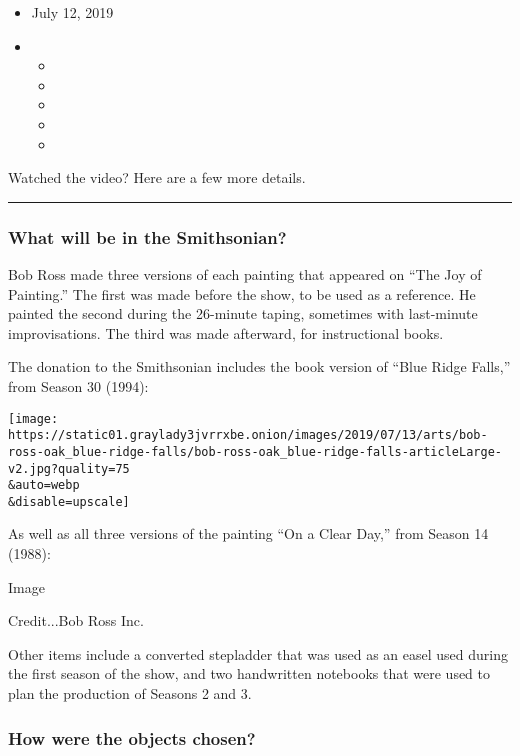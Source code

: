 \begin{itemize}
\item
  July 12, 2019
\item
  \begin{itemize}
  \item
  \item
  \item
  \item
  \item
  \end{itemize}
\end{itemize}

Watched the video? Here are a few more details.

\begin{center}\rule{0.5\linewidth}{\linethickness}\end{center}

\hypertarget{what-will-be-in-the-smithsonian}{%
\subsubsection{What will be in the
Smithsonian?}\label{what-will-be-in-the-smithsonian}}

Bob Ross made three versions of each painting that appeared on ``The Joy
of Painting.'' The first was made before the show, to be used as a
reference. He painted the second during the 26-minute taping, sometimes
with last-minute improvisations. The third was made afterward, for
instructional books.

The donation to the Smithsonian includes the book version of ``Blue
Ridge Falls,'' from Season 30 (1994):

\texttt{[image: https://static01.graylady3jvrrxbe.onion/images/2019/07/13/arts/bob-ross-oak\_blue-ridge-falls/bob-ross-oak\_blue-ridge-falls-articleLarge-v2.jpg?quality=75\\\&auto=webp\\\&disable=upscale]}

As well as all three versions of the painting ``On a Clear Day,'' from
Season 14 (1988):

Image

Credit...Bob Ross Inc.

Other items include a converted stepladder that was used as an easel
used during the first season of the show, and two handwritten notebooks
that were used to plan the production of Seasons 2 and 3.

\hypertarget{how-were-the-objects-chosen}{%
\subsubsection{How were the objects
chosen?}\label{how-were-the-objects-chosen}}

